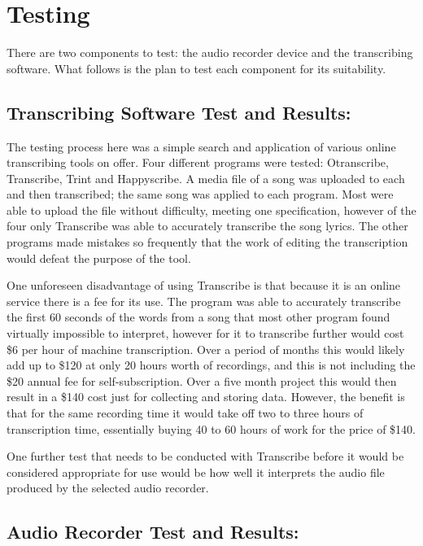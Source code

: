 \documentclass{article}
\begin{document}
\section{Testing}

There are two components to test: the audio recorder device and the transcribing software. What follows is the plan to test each component for its suitability.

\subsection{Transcribing Software Test and Results:}
The testing process here was a simple search and application of various online transcribing tools on offer. Four different programs were tested: Otranscribe, Transcribe, Trint and Happyscribe. A media file of a song was uploaded to each and then transcribed; the same song was applied to each program. Most were able to upload the file without difficulty, meeting one specification, however of the four only Transcribe was able to accurately transcribe the song lyrics. The other programs made mistakes so frequently that the work of editing the transcription would defeat the purpose of the tool. 

One unforeseen disadvantage of using Transcribe is that because it is an online service there is a fee for its use. The program was able to accurately transcribe the first 60 seconds of the words from a song that most other program found virtually impossible to interpret, however for it to transcribe further would cost \$6 per hour of machine transcription. Over a period of months this would likely add up to \$120 at only 20 hours worth of recordings, and this is not including the \$20 annual fee for self-subscription. Over a five month project this would then result in a \$140 cost just for collecting and storing data. However, the benefit is that for the same recording time it would take off two to three hours of transcription time, essentially buying 40 to 60 hours of work for the price of \$140.

One further test that needs to be conducted with Transcribe before it would be considered appropriate for use would be how well it interprets the audio file produced by the selected audio recorder.

\subsection{Audio Recorder Test and Results:}
\end{document}
